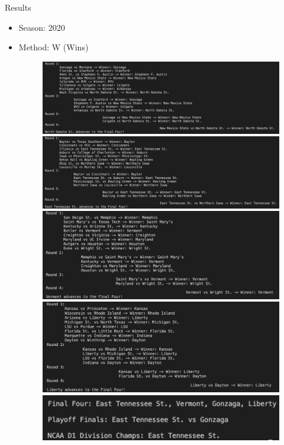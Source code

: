 \documentclass{beamer}
\begin{document}
\begin{frame}{Results}
\begin{itemize}
  \item Season: 2020 
  \item Method: W (Wins)
  
      \begin{figure}
      \includegraphics[width=0.4\linewidth]{CBB2020_wins_west16.png}
      \includegraphics[width=0.4\linewidth]{CBB2020_wins_south16.png}
      \includegraphics[width=0.4\linewidth]{CBB2020_wins_east16.png}
      \includegraphics[width=0.4\linewidth]{CBB2020_wins_midwest16.png}
      \includegraphics[width=0.6\linewidth]{CBB2020_wins_final.png}    
    \end{figure}
\end{itemize}
\end{frame}
\end{document}
